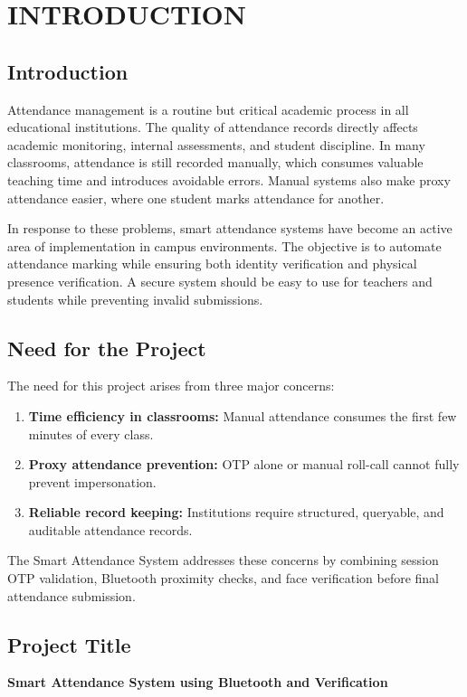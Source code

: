 \chapter{INTRODUCTION} \label{c1}
\justifying
\section{Introduction}
Attendance management is a routine but critical academic process in all educational institutions. The quality of attendance records directly affects academic monitoring, internal assessments, and student discipline. In many classrooms, attendance is still recorded manually, which consumes valuable teaching time and introduces avoidable errors. Manual systems also make proxy attendance easier, where one student marks attendance for another.

In response to these problems, smart attendance systems have become an active area of implementation in campus environments. The objective is to automate attendance marking while ensuring both identity verification and physical presence verification. A secure system should be easy to use for teachers and students while preventing invalid submissions.

\section{Need for the Project}
The need for this project arises from three major concerns:
\begin{enumerate}
\item \textbf{Time efficiency in classrooms:} Manual attendance consumes the first few minutes of every class.
\item \textbf{Proxy attendance prevention:} OTP alone or manual roll-call cannot fully prevent impersonation.
\item \textbf{Reliable record keeping:} Institutions require structured, queryable, and auditable attendance records.
\end{enumerate}

The Smart Attendance System addresses these concerns by combining session OTP validation, Bluetooth proximity checks, and face verification before final attendance submission.

\section{Project Title}
\textbf{Smart Attendance System using Bluetooth and Verification}

